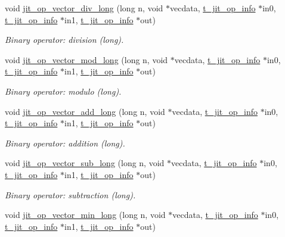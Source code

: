 \begin{DoxyCompactItemize}
void \hyperlink{group__opvecmod_ga1d3e0b24be891526c13c4f0365250d9d}{jit\_\-op\_\-vector\_\-div\_\-long} (long n, void $\ast$vecdata, \hyperlink{structt__jit__op__info}{t\_\-jit\_\-op\_\-info} $\ast$in0, \hyperlink{structt__jit__op__info}{t\_\-jit\_\-op\_\-info} $\ast$in1, \hyperlink{structt__jit__op__info}{t\_\-jit\_\-op\_\-info} $\ast$out)
\begin{DoxyCompactList}\small\item\em Binary operator: division (long). \item\end{DoxyCompactList}\item 
void \hyperlink{group__opvecmod_gae24771094108dccd629b376122ee58ba}{jit\_\-op\_\-vector\_\-mod\_\-long} (long n, void $\ast$vecdata, \hyperlink{structt__jit__op__info}{t\_\-jit\_\-op\_\-info} $\ast$in0, \hyperlink{structt__jit__op__info}{t\_\-jit\_\-op\_\-info} $\ast$in1, \hyperlink{structt__jit__op__info}{t\_\-jit\_\-op\_\-info} $\ast$out)
\begin{DoxyCompactList}\small\item\em Binary operator: modulo (long). \item\end{DoxyCompactList}\item 
void \hyperlink{group__opvecmod_ga895cbfbc2d6e888797444c1b89a1a35a}{jit\_\-op\_\-vector\_\-add\_\-long} (long n, void $\ast$vecdata, \hyperlink{structt__jit__op__info}{t\_\-jit\_\-op\_\-info} $\ast$in0, \hyperlink{structt__jit__op__info}{t\_\-jit\_\-op\_\-info} $\ast$in1, \hyperlink{structt__jit__op__info}{t\_\-jit\_\-op\_\-info} $\ast$out)
\begin{DoxyCompactList}\small\item\em Binary operator: addition (long). \item\end{DoxyCompactList}\item 
void \hyperlink{group__opvecmod_gabb14bd485004dafe45778194102e2dae}{jit\_\-op\_\-vector\_\-sub\_\-long} (long n, void $\ast$vecdata, \hyperlink{structt__jit__op__info}{t\_\-jit\_\-op\_\-info} $\ast$in0, \hyperlink{structt__jit__op__info}{t\_\-jit\_\-op\_\-info} $\ast$in1, \hyperlink{structt__jit__op__info}{t\_\-jit\_\-op\_\-info} $\ast$out)
\begin{DoxyCompactList}\small\item\em Binary operator: subtraction (long). \item\end{DoxyCompactList}\item 
void \hyperlink{group__opvecmod_gac673d3a9b0d7691e89ebe13bd09d0863}{jit\_\-op\_\-vector\_\-min\_\-long} (long n, void $\ast$vecdata, \hyperlink{structt__jit__op__info}{t\_\-jit\_\-op\_\-info} $\ast$in0, \hyperlink{structt__jit__op__info}{t\_\-jit\_\-op\_\-info} $\ast$in1, \hyperlink{structt__jit__op__info}{t\_\-jit\_\-op\_\-info} $\ast$out)

\end{DoxyCompactItemize}
